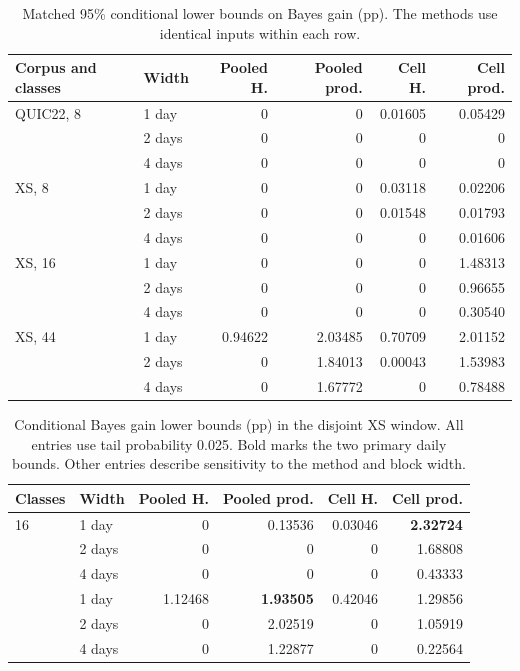 \documentclass[preprint,11pt]{elsarticle}
\begin{document}
\begin{table}[t]
\centering
\small
\setlength{\tabcolsep}{5pt}
\caption{Matched 95\% conditional lower bounds on Bayes gain (pp). The methods use identical inputs within each row.}
\label{tab:bounds}
\begin{tabular}{llrrrr}
\toprule
Corpus and classes & Width & Pooled H. & Pooled prod. & Cell H. & Cell prod. \\
\midrule
QUIC22, 8 & 1 day & 0 & 0 & 0.01605 & 0.05429 \\
 & 2 days & 0 & 0 & 0 & 0 \\
 & 4 days & 0 & 0 & 0 & 0 \\
\addlinespace
XS, 8 & 1 day & 0 & 0 & 0.03118 & 0.02206 \\
 & 2 days & 0 & 0 & 0.01548 & 0.01793 \\
 & 4 days & 0 & 0 & 0 & 0.01606 \\
\addlinespace
XS, 16 & 1 day & 0 & 0 & 0 & 1.48313 \\
 & 2 days & 0 & 0 & 0 & 0.96655 \\
 & 4 days & 0 & 0 & 0 & 0.30540 \\
\addlinespace
XS, 44 & 1 day & 0.94622 & 2.03485 & 0.70709 & 2.01152 \\
 & 2 days & 0 & 1.84013 & 0.00043 & 1.53983 \\
 & 4 days & 0 & 1.67772 & 0 & 0.78488 \\
\bottomrule
\end{tabular}
\end{table}

\begin{table}[t]
\centering
\small
\setlength{\tabcolsep}{5pt}
\caption{Conditional Bayes gain lower bounds (pp) in the disjoint XS window. All entries use tail probability 0.025. Bold marks the two primary daily bounds. Other entries describe sensitivity to the method and block width.}
\label{tab:temporal-check}
\begin{tabular}{llrrrr}
\toprule
Classes & Width & Pooled H. & Pooled prod. & Cell H. & Cell prod. \\
\midrule
16 & 1 day & 0 & 0.13536 & 0.03046 & \textbf{2.32724} \\
   & 2 days & 0 & 0 & 0 & 1.68808 \\
   & 4 days & 0 & 0 & 0 & 0.43333 \\
\addlinespace
44 & 1 day & 1.12468 & \textbf{1.93505} & 0.42046 & 1.29856 \\
   & 2 days & 0 & 2.02519 & 0 & 1.05919 \\
   & 4 days & 0 & 1.22877 & 0 & 0.22564 \\
\bottomrule
\end{tabular}
\end{table}
\end{document}
